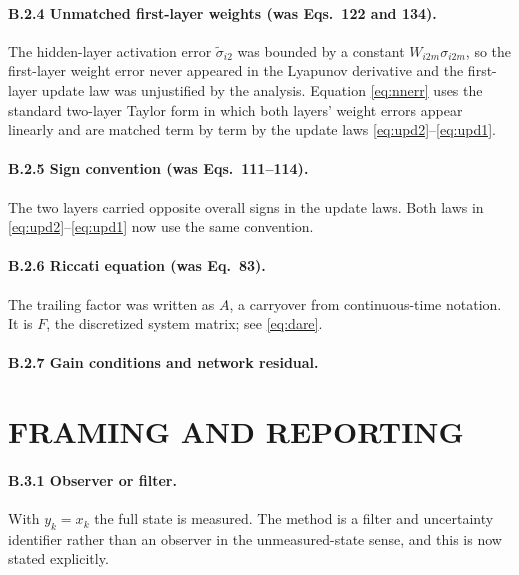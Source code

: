 \paragraph{B.2.4 Unmatched first-layer weights (was Eqs.~122 and 134).}
The hidden-layer activation error $\tilde\sigma_{i2}$ was bounded by a constant
$W_{i2m}\sigma_{i2m}$, so the first-layer weight error never appeared in the
Lyapunov derivative and the first-layer update law was unjustified by the
analysis. Equation \eqref{eq:nnerr} uses the standard two-layer Taylor form in
which both layers' weight errors appear linearly and are matched term by term by
the update laws \eqref{eq:upd2}--\eqref{eq:upd1}.

\paragraph{B.2.5 Sign convention (was Eqs.~111--114).}
The two layers carried opposite overall signs in the update laws. Both laws in
\eqref{eq:upd2}--\eqref{eq:upd1} now use the same convention.

\paragraph{B.2.6 Riccati equation (was Eq.~83).}
The trailing factor was written as $A$, a carryover from continuous-time
notation. It is $F$, the discretized system matrix; see \eqref{eq:dare}.

\paragraph{B.2.7 Gain conditions and network residual.} 

\section{FRAMING AND REPORTING}

\paragraph{B.3.1 Observer or filter.}
With $y_k=x_k$ the full state is measured. The method is a filter and
uncertainty identifier rather than an observer in the unmeasured-state sense,
and this is now stated explicitly.

